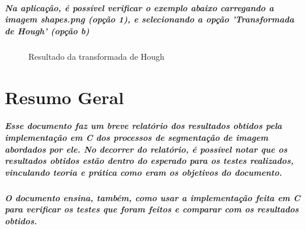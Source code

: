 \documentclass[12pt,fleqn]{article}
\begin{document}
      \subparagraph{\normalfont Na aplicação, é possível verificar o exemplo abaixo carregando a imagem shapes.png (opção 1), e selecionando a opção 'Transformada de Hough' (opção b)}

      \newpage

      \begin{figure}[!htb]
      \centering
      \caption{Resultado da transformada de Hough}
      \label{fig:Resultado 1}
      \end{figure}


\section{Resumo Geral}

  \subparagraph{\normalfont Esse documento faz um breve relatório dos resultados obtidos pela implementação em C dos processos de segmentação de imagem abordados por ele. 
  No decorrer do relatório, é possível notar que os resultados obtidos estão dentro do esperado para os testes realizados, vinculando teoria e prática como eram os objetivos do documento.}

  \subparagraph{\normalfont O documento ensina, também, como usar a implementação feita em C para verificar os testes que foram feitos e comparar com os resultados obtidos.}
\end{document}
